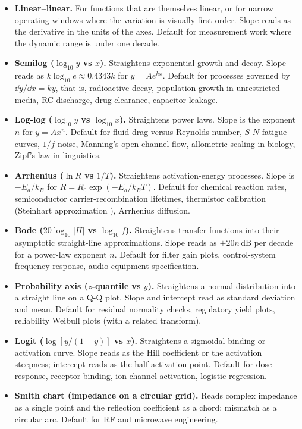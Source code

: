 \begin{itemize}[leftmargin=*]
  \item \textbf{Linear--linear.} For functions that are themselves
    linear, or for narrow operating windows where the variation is
    visually first-order. Slope reads as the derivative in the
    units of the axes. Default for measurement work where the
    dynamic range is under one decade.
  \item \textbf{Semilog ($\log_{10} y$ vs $x$).} Straightens
    exponential growth and decay. Slope reads as $k \log_{10} e
    \approx 0.4343 k$ for $y = A e^{kx}$. Default for processes
    governed by $\dd y/\dd x = k y$, that is, radioactive decay,
    population growth in unrestricted media, RC discharge, drug
    clearance, capacitor leakage.
  \item \textbf{Log-log ($\log_{10} y$ vs $\log_{10} x$).}
    Straightens power laws. Slope is the exponent $n$ for $y = A
    x^{n}$. Default for fluid drag versus Reynolds number, $S$-$N$
    fatigue curves, $1/f$ noise, Manning's open-channel flow,
    allometric scaling in biology, Zipf's law in linguistics.
  \item \textbf{Arrhenius ($\ln R$ vs $1/T$).} Straightens
    activation-energy processes. Slope is $-E_{a}/k_{B}$ for
    $R = R_{0} \exp(-E_{a}/k_{B} T)$. Default for chemical
    reaction rates, semiconductor carrier-recombination lifetimes,
    thermistor calibration (Steinhart approximation
    \cite{v2c02-paper:steinhart-hart-1968}), Arrhenius diffusion.
  \item \textbf{Bode ($20 \log_{10} |H|$ vs $\log_{10} f$).}
    Straightens transfer functions into their asymptotic
    straight-line approximations. Slope reads as $\pm 20 n\,\si
    {\deci\bel}$ per decade for a power-law exponent $n$. Default
    for filter gain plots, control-system frequency response,
    audio-equipment specification.
  \item \textbf{Probability axis ($z$-quantile vs $y$).} Straightens
    a normal distribution into a straight line on a Q-Q plot.
    Slope and intercept read as standard deviation and mean.
    Default for residual normality checks, regulatory yield
    plots, reliability Weibull plots (with a related transform).
  \item \textbf{Logit ($\log[y/(1 - y)]$ vs $x$).} Straightens a
    sigmoidal binding or activation curve. Slope reads as the Hill
    coefficient or the activation steepness; intercept reads as
    the half-activation point. Default for dose-response, receptor
    binding, ion-channel activation, logistic regression.
  \item \textbf{Smith chart (impedance on a circular grid).}
    Reads complex impedance as a single point and the reflection
    coefficient as a chord; mismatch as a circular arc. Default
    for RF and microwave engineering.
\end{itemize}

